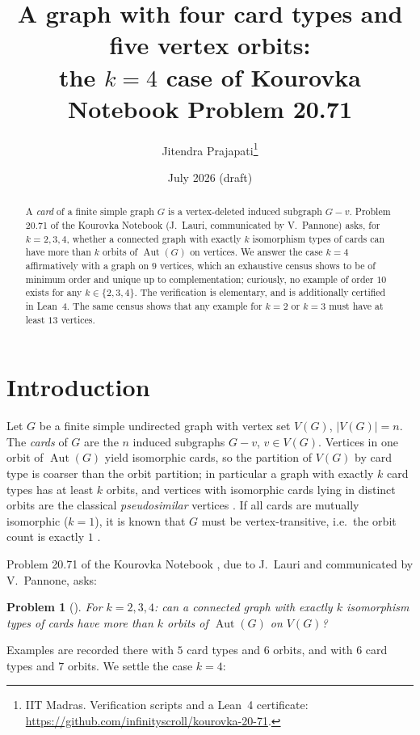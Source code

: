 \documentclass[11pt]{article}
\title{A graph with four card types and five vertex orbits:\\
the $k=4$ case of Kourovka Notebook Problem 20.71}
\author{Jitendra Prajapati\thanks{IIT Madras. Verification scripts and a
Lean~4 certificate: \url{https://github.com/infinityscroll/kourovka-20-71}.}}
\date{July 2026 (draft)}
\newtheorem{problem}[theorem]{Problem}
\theoremstyle{remark}
\begin{document}
\maketitle

\begin{abstract}
A \emph{card} of a finite simple graph $G$ is a vertex-deleted induced
subgraph $G - v$. Problem 20.71 of the Kourovka Notebook (J.~Lauri,
communicated by V.~Pannone) asks, for $k = 2, 3, 4$, whether a connected
graph with exactly $k$ isomorphism types of cards can have more than $k$
orbits of $\operatorname{Aut}(G)$ on vertices. We answer the case $k = 4$
affirmatively with a graph on $9$ vertices, which an exhaustive census shows
to be of minimum order and unique up to complementation; curiously, no
example of order $10$ exists for any $k \in \{2,3,4\}$. The verification is
elementary, and is additionally certified in Lean~4. The same census shows that any example for $k = 2$ or
$k = 3$ must have at least $13$ vertices.
\end{abstract}

\section{Introduction}

Let $G$ be a finite simple undirected graph with vertex set $V(G)$,
$|V(G)| = n$. The \emph{cards} of $G$ are the $n$ induced subgraphs
$G - v$, $v \in V(G)$. Vertices in one orbit of $\operatorname{Aut}(G)$
yield isomorphic cards, so the partition of $V(G)$ by card type is coarser
than the orbit partition; in particular a graph with exactly $k$ card types
has at least $k$ orbits, and vertices with isomorphic cards lying in
distinct orbits are the classical \emph{pseudosimilar} vertices
\cite{GK82,Lauri97,LS16}. If all cards are mutually isomorphic ($k=1$), it
is known that $G$ must be vertex-transitive, i.e.\ the orbit count is
exactly $1$ \cite[Problem 20.71, comment]{KN21}.

Problem 20.71 of the Kourovka Notebook \cite{KN21}, due to J.~Lauri and
communicated by V.~Pannone, asks:

\begin{problem}[{\cite[20.71]{KN21}}]\label{prob}
For $k = 2, 3, 4$: can a connected graph with exactly $k$ isomorphism types
of cards have more than $k$ orbits of $\operatorname{Aut}(G)$ on $V(G)$?
\end{problem}

Examples are recorded there with $5$ card types and $6$ orbits, and with
$6$ card types and $7$ orbits. We settle the case $k = 4$:
\end{document}
